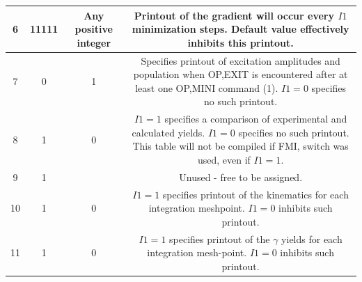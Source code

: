 \documentclass[10pt]{article}
\begin{document}
\begin{center}
\begin{tabular}{|c|c|c|c|}
\hline
6 & 11111 & Any positive integer & Printout of the gradient will occur every $I 1$ minimization steps. Default value effectively inhibits this printout. \\
\hline
7 & 0 & 1 & Specifies printout of excitation amplitudes and population when OP,EXIT is encountered after at least one OP,MINI command (1). $I 1=0$ specifies no such printout. \\
\hline
8 & 1 & 0 & $I 1=1$ specifies a comparison of experimental and calculated yields. $I 1=0$ specifies no such printout. This table will not be compiled if FMI, switch was used, even if $I 1=1$. \\
\hline
9 & 1 &  & Unused - free to be assigned. \\
\hline
10 & 1 & 0 & $I 1=1$ specifies printout of the kinematics for each integration meshpoint. $I 1=0$ inhibits such printout. \\
\hline
11 & 1 & 0 & $I 1=1$ specifies printout of the $\gamma$ yields for each integration mesh-point. $I 1=0$ inhibits such printout. \\
\hline
\end{tabular}
\end{center}
\end{document}
